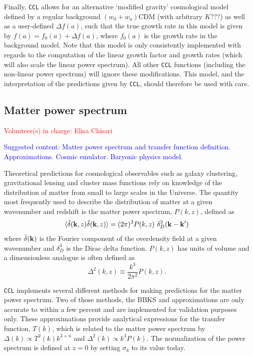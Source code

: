 \documentclass[\docopts]{\docclass}
\newcommand{\vol}[1]{\textcolor{red}{Volunteer(s) in charge: #1}}
\newcommand{\cont}[1]{\textcolor{blue}{Suggested content: #1}}
\newcommand{\ccl}{{\tt CCL}\xspace}
\begin{document}
Finally, \ccl allows for an alternative `modified gravity' cosmological model defined by a regular background $(w_0+w_a)$CDM (with arbitrary $K$???) as well as a user-defined $\Delta f(a)$, such that the true growth rate in this model is given by $f(a)=f_0(a)+\Delta f(a)$, where $f_0(a)$ is the growth rate in the background model. Note that this model is only consistently implemented with regards to the computation of the linear growth factor and growth rates (which will also scale the linear power spectrum). All other \ccl functions (including the non-linear power spectrum) will ignore these modifications. This model, and the interpretation of the predictions given by \ccl, should therefore be used with care.


\subsection{Matter power spectrum}
\vol{Elisa Chisari}

\cont{Matter power spectrum and transfer function definition. Approximations. Cosmic emulator. Baryonic physics model.}

Theoretical predictions for cosmological observables such as galaxy clustering, gravitational lensing and cluster mass functions rely on knowledge of the distribution of matter from small to large scales in the Universe. The quantity most frequently used to describe the distribution of matter at a given wavenumber and redshift is the matter power spectrum, $P(k,z)$, defined as
\begin{equation}
  \langle \tilde\delta({\bf k},z)\tilde\delta({\bf k},z)\rangle = (2\pi)^3P(k,z)\
\delta_D^3({\bf k}-{\bf k}')
\end{equation}
where $\tilde\delta({\bf k})$ is the Fourier component of the overdensity field at a given wavenumber and $\delta_D^3$ is the Dirac delta function. $P(k,z)$ has units of volume and a dimensionless analogue is often defined as
\begin{equation}
  \Delta^2(k,z) \equiv \frac{k^3}{2\pi^2}P(k,z).
\end{equation}

\ccl implements several different methods for making predictions for the matter power spectrum. Two of those methods, the BBKS \citep{BBKS} and \citet{1998ApJ...496..605E} approximations are only accurate to within a few percent and are implemented for validation purposes only. These approximations provide analytical expressions for the trasnfer function, $T(k)$, which is related to the matter power spectrum by $\Delta(k)\propto T^2(k)k^{3+n}$ and $\Delta^2(k)\propto k^3P(k)$. The normalization of the power spectrum is defined at $z=0$ by setting $\sigma_8$ to its value today.
\end{document}
